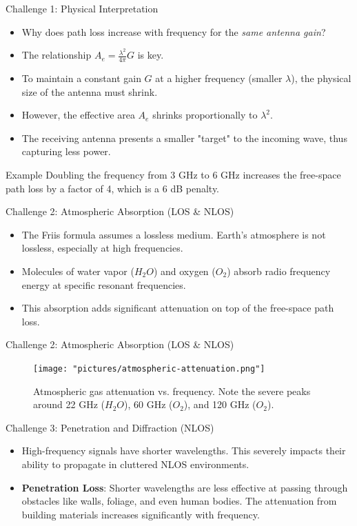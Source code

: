 \documentclass{beamer}
\begin{document}
	\begin{frame}{Challenge 1: Physical Interpretation}
		\begin{itemize}
			\item Why does path loss increase with frequency for the \textit{same antenna gain}?
			\item The relationship $A_e = \frac{\lambda^2}{4\pi} G$ is key.
			\item To maintain a constant gain $G$ at a higher frequency (smaller $\lambda$), the physical size of the antenna must shrink.
			\item However, the effective area $A_e$ shrinks proportionally to $\lambda^2$.
			\item The receiving antenna presents a smaller "target" to the incoming wave, thus capturing less power.
		\end{itemize}
		\begin{alertblock}{Example}
			Doubling the frequency from 3 GHz to 6 GHz increases the free-space path loss by a factor of 4, which is a 6 dB penalty.
		\end{alertblock}
	\end{frame}
	
	\begin{frame}{Challenge 2: Atmospheric Absorption (LOS \& NLOS)}
		\begin{itemize}
			\item The Friis formula assumes a lossless medium. Earth's atmosphere is not lossless, especially at high frequencies.
			\item Molecules of water vapor ($H_2O$) and oxygen ($O_2$) absorb radio frequency energy at specific resonant frequencies.
			\item This absorption adds significant attenuation on top of the free-space path loss.
		\end{itemize}
	\end{frame}
	
	\begin{frame}{Challenge 2: Atmospheric Absorption (LOS \& NLOS)}
		\begin{figure}
			\centering
			\texttt{[image: "pictures/atmospheric-attenuation.png"]}
			\caption{Atmospheric gas attenuation vs. frequency. Note the severe peaks around 22 GHz ($H_2O$), 60 GHz ($O_2$), and 120 GHz ($O_2$).}
		\end{figure}
	\end{frame}
	
	\begin{frame}{Challenge 3: Penetration and Diffraction (NLOS)}
		\begin{itemize}
			\item High-frequency signals have shorter wavelengths. This severely impacts their ability to propagate in cluttered NLOS environments.
			\item \textbf{Penetration Loss}: Shorter wavelengths are less effective at passing through obstacles like walls, foliage, and even human bodies. The attenuation from building materials increases significantly with frequency.
		\end{itemize}
	\end{frame}
	
\end{document}
